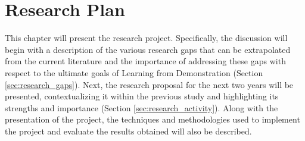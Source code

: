 \chapter{Research Plan}
\label{chapter:research_plan}
This chapter will present the research project. Specifically, the discussion will begin with a description of the various research gaps that can be extrapolated from the current literature and the importance of addressing these gaps with respect to the ultimate goals of Learning from Demonstration (Section \ref{sec:research_gaps}). Next, the research proposal for the next two years will be presented, contextualizing it within the previous study and highlighting its strengths and importance (Section \ref{sec:research_activity}). Along with the presentation of the project, the techniques and methodologies used to implement the project and evaluate the results obtained will also be described.



